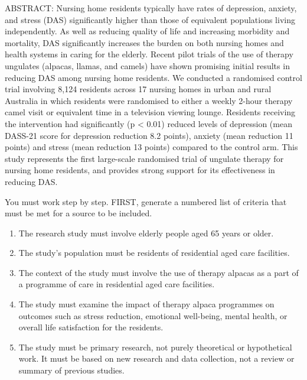 \documentclass{article}
\begin{document}
\begin{description}
    ABSTRACT: Nursing home residents typically have rates of depression, anxiety,
    and stress (DAS) significantly higher than those of equivalent populations
    living independently. As well as reducing quality of life and increasing
    morbidity and mortality, DAS significantly increases the burden on both
    nursing homes and health systems in caring for the elderly. Recent pilot
    trials of the use of therapy ungulates (alpacas, llamas, and camels) have
    shown promising initial results in reducing DAS among nursing home residents.
    We conducted a randomised control trial involving 8,124 residents across 17
    nursing homes in urban and rural Australia in which residents were randomised
    to either a weekly 2-hour therapy camel visit or equivalent time in a
    television viewing lounge. Residents receiving the intervention had
    significantly (p < 0.01) reduced levels of depression (mean DASS-21 score for
    depression reduction 8.2 points), anxiety (mean reduction 11 points) and
    stress (mean reduction 13 points) compared to the control arm. This study
    represents the first large-scale randomised trial of ungulate therapy for
    nursing home residents, and provides strong support for its effectiveness in
    reducing DAS.

    \System You must work step by step. FIRST, generate a numbered list of
    criteria that must be met for a source to be included.

    \GPT \begin{enumerate}
      \item{The research study must involve elderly people aged 65 years or older.}
      \item{The study's population must be residents of residential aged care
        facilities.}
      \item{The context of the study must involve the use of therapy alpacas as
        a part of a programme of care in residential aged care facilities.}
      \item{The study must examine the impact of therapy alpaca programmes on
        outcomes such as stress reduction, emotional well-being, mental health,
        or overall life satisfaction for the residents.}
      \item{The study must be primary research, not purely theoretical or
        hypothetical work. It must be based on new research and data
        collection, not a review or summary of previous studies.}
    \end{enumerate}


\end{description}
\end{document}
